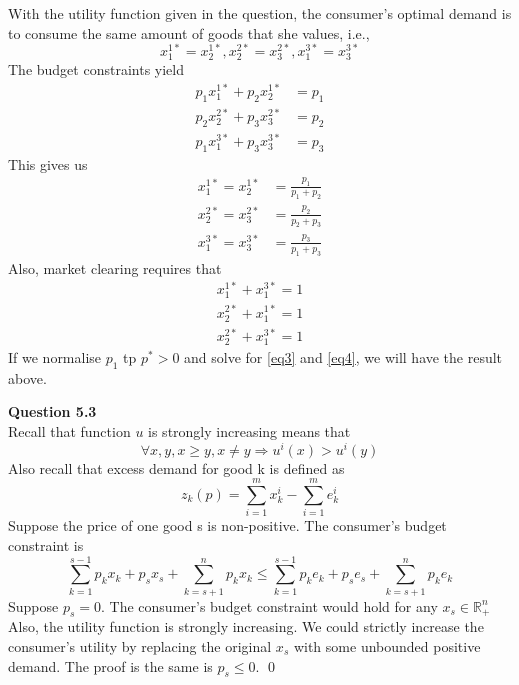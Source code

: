 \documentclass[letterpaper,12pt]{article}
\theoremstyle{definition}
\begin{document}
With the utility function given in the question, the consumer's optimal demand is to consume the same amount of goods that she values, i.e.,
$$
x _ { 1 } ^ { 1 * } = x _ { 2 } ^ { 1 * } , x _ { 2 } ^ { 2 * } = x _ { 3 } ^ { 2 * } , x _ { 1 } ^ { 3 * } = x _ { 3 } ^ { 3 * }
$$
The budget constraints yield
\begin{equation}
 \begin{aligned} p _ { 1 } x _ { 1 } ^ { 1 * } + p _ { 2 } x _ { 2 } ^ { 1 * } & = p _ { 1 } \\ p _ { 2 } x _ { 2 } ^ { 2 * } + p _ { 3 } x _ { 3 } ^ { 2 * } & = p _ { 2 } \\ p _ { 1 } x _ { 1 } ^ { 3 * } + p _ { 3 } x _ { 3 } ^ { 3 * } & = p _ { 3 } \end{aligned}   
\end{equation}
This gives us
\begin{equation}\label{eq3}
\begin{aligned}
    x_1^{1*} = x_2^{1*} &= \frac{p_1}{p_1 + p_2}\\
    x_2^{2*} = x_3^{2*} &= \frac{p_2}{p_2 + p_3}\\
    x_1^{3*} = x_3^{3*} &= \frac{p_3}{p_1 + p_3}
    \end{aligned}
\end{equation}
Also, market clearing requires that
\begin{equation}\label{eq4}
\begin{aligned} { x _ { 1 } ^ { 1 * } + x _ { 1 } ^ { 3 * } = 1 } \\
{ x _ { 2 } ^ { 2 * } + x _ { 1 } ^ { 1 * } = 1 } \\
{ x _ { 2 } ^ { 2 * } + x _ { 1 } ^ { 3 * } = 1 } 
\end{aligned}
\end{equation}
If we normalise $p_1$ tp $p^* > 0$ and solve for \ref{eq3} and \ref{eq4}, we will have the result above.
\vspace{5mm}

\noindent\textbf{Question 5.3}\\
Recall that function $u$ is strongly increasing means that $$\forall x, y, x \geq y,  x \neq y  \Rightarrow u^i(x) > u^i(y)$$
Also recall that excess demand for good k is defined as 
$$
z_k(p) = \sum_{i=1}^m x_k^i - \sum_{i=1}^{m} e_k^i
$$
Suppose the price of one good s is non-positive. The consumer's budget constraint is \begin{equation}
    \sum_{k=1}^{s-1} p_{k}x_{k} + p_{s}x_{s} + \sum_{k=s+1}^{n} p_{k}x_{k} \leq \sum_{k=1}^{s-1} p_{k}e_{k} + p_{s}e_{s} + \sum_{k=s+1}^{n} p_{k}e_{k}
\end{equation}
Suppose $p_s = 0$. The consumer's budget constraint would hold for any $x_s \in \mathbb{R}_{+}^{n}$\\
Also, the utility function is strongly increasing. We could strictly increase the consumer's utility by replacing the original $x_s$ with some unbounded positive demand. The proof is the same is $p_s \leq 0$. \qed
\end{document}
